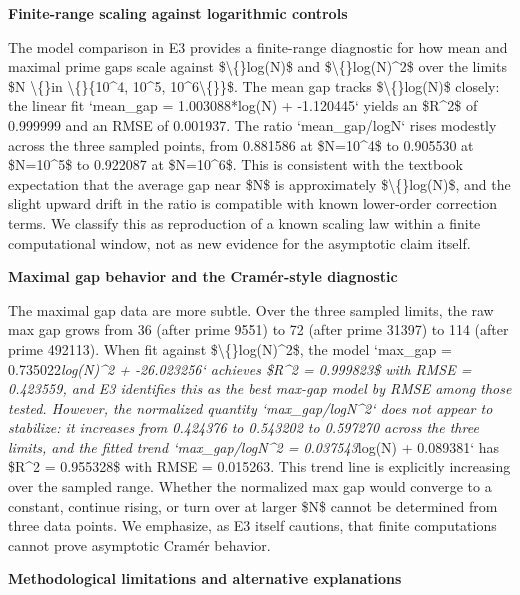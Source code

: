 \documentclass[11pt,a4paper]{article}
\begin{document}
\textbf{Finite-range scaling against logarithmic controls}

The model comparison in E3 provides a finite-range diagnostic for how mean and maximal prime gaps scale against \$\textbackslash\{\}log(N)\$ and \$\textbackslash\{\}log(N)\textasciicircum{}2\$ over the limits \$N \textbackslash\{\}in \textbackslash\{\}\{10\textasciicircum{}4, 10\textasciicircum{}5, 10\textasciicircum{}6\textbackslash\{\}\}\$. The mean gap tracks \$\textbackslash\{\}log(N)\$ closely: the linear fit `mean\_gap = 1.003088*log(N) + -1.120445` yields an \$R\textasciicircum{}2\$ of 0.999999 and an RMSE of 0.001937. The ratio `mean\_gap/logN` rises modestly across the three sampled points, from 0.881586 at \$N=10\textasciicircum{}4\$ to 0.905530 at \$N=10\textasciicircum{}5\$ to 0.922087 at \$N=10\textasciicircum{}6\$. This is consistent with the textbook expectation that the average gap near \$N\$ is approximately \$\textbackslash\{\}log(N)\$, and the slight upward drift in the ratio is compatible with known lower-order correction terms. We classify this as reproduction of a known scaling law within a finite computational window, not as new evidence for the asymptotic claim itself.

\textbf{Maximal gap behavior and the Cramér-style diagnostic}

The maximal gap data are more subtle. Over the three sampled limits, the raw max gap grows from 36 (after prime 9551) to 72 (after prime 31397) to 114 (after prime 492113). When fit against \$\textbackslash\{\}log(N)\textasciicircum{}2\$, the model `max\_gap = 0.735022\textit{log(N)\textasciicircum{}2 + -26.023256` achieves \$R\textasciicircum{}2 = 0.999823\$ with RMSE = 0.423559, and E3 identifies this as the best max-gap model by RMSE among those tested. However, the normalized quantity `max\_gap/logN\textasciicircum{}2` does not appear to stabilize: it increases from 0.424376 to 0.543202 to 0.597270 across the three limits, and the fitted trend `max\_gap/logN\textasciicircum{}2 = 0.037543}log(N) + 0.089381` has \$R\textasciicircum{}2 = 0.955328\$ with RMSE = 0.015263. This trend line is explicitly increasing over the sampled range. Whether the normalized max gap would converge to a constant, continue rising, or turn over at larger \$N\$ cannot be determined from three data points. We emphasize, as E3 itself cautions, that finite computations cannot prove asymptotic Cramér behavior.

\textbf{Methodological limitations and alternative explanations}
\end{document}
